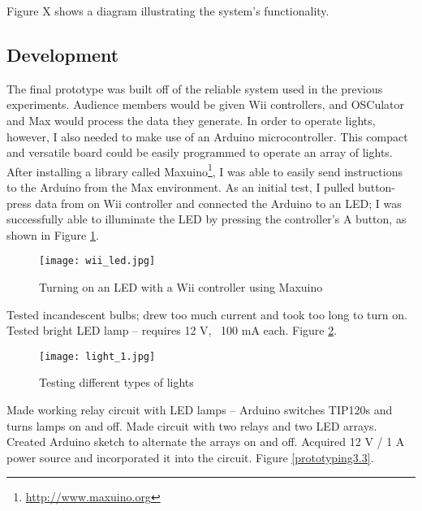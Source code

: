 Figure X shows a diagram illustrating the system's functionality.



\subsection{Development}

The final prototype was built off of the reliable system used in the previous experiments. Audience members would be given Wii controllers, and OSCulator and Max would process the data they generate. In order to operate lights, however, I also needed to make use of an Arduino microcontroller. This compact and versatile board could be easily programmed to operate an array of lights. After installing a library called Maxuino\footnote{\url{http://www.maxuino.org}}, I was able to easily send instructions to the Arduino from the Max environment. As an initial test, I pulled button-press data from on Wii controller and connected the Arduino to an LED; I was successfully able to illuminate the LED by pressing the controller's A button, as shown in Figure \ref{prototyping3.1}.

\begin{figure}[t]
	\centering

	\texttt{[image: wii\_led.jpg]}
	\caption{Turning on an LED with a Wii controller using Maxuino}

	\label{prototyping3.1}
\end{figure}

Tested incandescent bulbs; drew too much current and took too long to turn on. Tested bright LED lamp -- requires 12 V, ~100 mA each. Figure \ref{prototyping3.2}.

\begin{figure}[t]
	\centering

	\texttt{[image: light\_1.jpg]}
	\caption{Testing different types of lights}

	\label{prototyping3.2}
\end{figure}

Made working relay circuit with LED lamps -- Arduino switches TIP120s and turns lamps on and off. Made circuit with two relays and two LED arrays. Created Arduino sketch to alternate the arrays on and off. Acquired 12 V / 1 A power source and incorporated it into the circuit. Figure \ref{prototyping3.3}.

